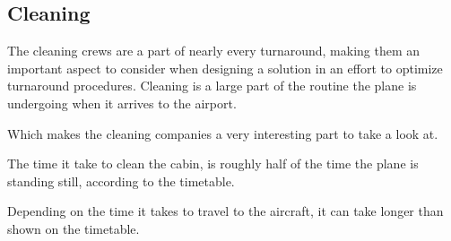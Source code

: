 \subsection{Cleaning}
The cleaning crews are a part of nearly every turnaround, making them an important aspect to consider when designing a solution in an effort to optimize turnaround procedures.
Cleaning is a large part of the routine the plane is undergoing when it arrives to the airport.

Which makes the cleaning companies a very interesting part to take a look at.

The time it take to clean the cabin, is roughly half of the time the plane is standing still, according to the timetable.

Depending on the time it takes to travel to the aircraft, it can take longer than shown on the timetable.





